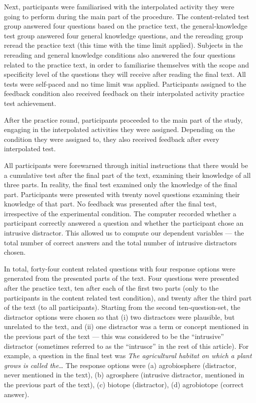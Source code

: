 Next, participants were familiarised with the interpolated activity they
were going to perform during the main part of the procedure. The
content-related test group answered four questions based on the practice
text, the general-knowledge test group answered four general knowledge
questions, and the rereading group reread the practice text (this time
with the time limit applied). Subjects in the rereading and general
knowledge conditions also answered the four questions related to the
practice text, in order to familiarise themselves with the scope and
specificity level of the questions they will receive after reading the
final text. All tests were self-paced and no time limit was applied.
Participants assigned to the feedback condition also received feedback
on their interpolated activity practice test achievement.

After the practice round, participants proceeded to the main part of the
study, engaging in the interpolated activities they were assigned.
Depending on the condition they were assigned to, they also received
feedback after every interpolated test.

All participants were forewarned through initial instructions that there
would be a cumulative test after the final part of the text, examining
their knowledge of all three parts. In reality, the final test examined
only the knowledge of the final part. Participants were presented with
twenty novel questions examining their knowledge of that part. No
feedback was presented after the final test, irrespective of the
experimental condition. The computer recorded whether a participant
correctly answered a question and whether the participant chose an
intrusive distractor. This allowed us to compute our dependent variables
--- the total number of correct answers and the total number of
intrusive distractors chosen.

In total, forty-four content related questions with four response
options were generated from the presented parts of the text. Four
questions were presented after the practice text, ten after each of the
first two parts (only to the participants in the content related test
condition), and twenty after the third part of the text (to all
participants). Starting from the second ten-question-set, the distractor
options were chosen so that (i) two distractors were plausible, but
unrelated to the text, and (ii) one distractor was a term or concept
mentioned in the previous part of the text --- this was considered to be
the ``intrusive'' distractor (sometimes referred to as the ``intrusor''
in the rest of this article). For example, a question in the final test
was
\textit{The agricultural habitat on which a plant grows is called the\ldots}
The response options were (a) agrobiosphere (distractor, never mentioned
in the text), (b) agrosphere (intrusive distractor, mentioned in the
previous part of the text), (c) biotope (distractor), (d) agrobiotope
(correct answer).

